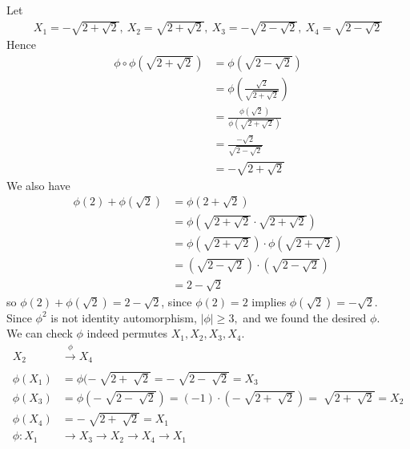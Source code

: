 \documentclass{article}
\begin{document}
\begin{homeworkProblem}
    Let 
    \begin{align}
    X_1 = - \sqrt{2 + \sqrt{2}}, \ X_2 = \sqrt{2 + \sqrt{2}}, \ X_3 = - \sqrt{2 - \sqrt{2}}, \ X_4 = \sqrt{2 - \sqrt{2}}
    \end{align}
    Hence 
    \begin{align}
        \phi \circ \phi \left( \sqrt{2 + \sqrt{2}}\right) &= \phi \left( \sqrt{2 - \sqrt{2}}\right) \\ 
        &= \phi \left( \frac{ \sqrt{2} }{ \sqrt{2+\sqrt{2}} }\right)\\
        &= \frac{ \phi (\sqrt{2}) }{ \phi \left( \sqrt{2 + \sqrt{2}}\right) }\\
        &= \frac{ - \sqrt{2} }{ \sqrt{2-\sqrt{2}} }\\
        &= - \sqrt{2 + \sqrt{2}}
    \end{align}
    We also have
    \begin{align}
        \phi(2) + \phi(\sqrt{2}) &= \phi(2 + \sqrt{2})\\
        &= \phi \left( \sqrt{2 + \sqrt{2}} \cdot \sqrt{2 + \sqrt{2}} \right)\\
        &= \phi \left( \sqrt{2 + \sqrt{2}} \right) \cdot \phi \left( \sqrt{2 + \sqrt{2}} \right)\\
        &= \left( \sqrt{2 - \sqrt{2}} \right) \cdot \left( \sqrt{2 - \sqrt{2}} \right)\\
        &= 2 - \sqrt{2}
    \end{align}
    so $\phi(2) + \phi(\sqrt{2}) = 2 - \sqrt{2}$,
    since $\phi(2) = 2$ implies $\phi(\sqrt{2}) = - \sqrt{2}$.\\
    Since $\phi^2$ is not identity automorphism, $\lvert \phi \rvert \geq 3,$ 
    and we found the desired $\phi$.\\
    We can check $\phi$ indeed permutes $X_1, X_2, X_3, X_4$.\\
    \begin{align}
        X_2 &\xrightarrow[]{\phi}    X_4\\
        \phi(X_1) &= \phi(-\sqrt[]{2+\sqrt[]{2}} = - \sqrt[]{2-\sqrt[]{2}} = X_3\\
        \phi(X_3) &= \phi(- \sqrt[]{2-\sqrt[]{2}}) = (-1)\cdot (-\sqrt[]{2+\sqrt[]{2}}) = \sqrt[]{2+\sqrt[]{2}} = X_2\\
        \phi(X_4) &= - \sqrt[]{2+\sqrt[]{2}} = X_1\\
        \phi: X_1 &\xrightarrow[]{} X_3 \xrightarrow[]{} X_2 \xrightarrow[]{} X_4 \xrightarrow[]{} X_1
    \end{align}


\end{homeworkProblem}
\end{document}
